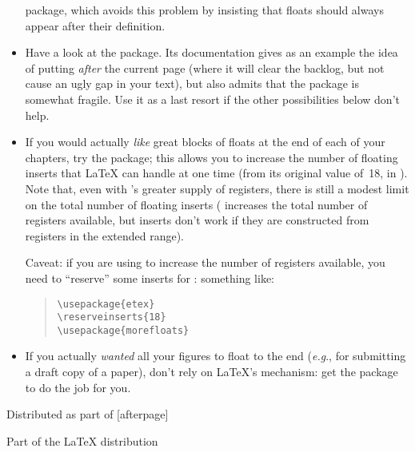 \begin{itemize}
  package, which avoids this problem by insisting that floats should
  always appear after their definition.
\item Have a look at the \LaTeXe{}  package.
  Its documentation gives as an example the idea
  of putting  \emph{after} the current page (where it
  will clear the backlog, but not cause an ugly gap in your text), but
  also admits that the package is somewhat fragile.  Use it as a last
  resort if the other possibilities below don't help.
\item If you would actually \emph{like} great blocks of floats at the
  end of each of your chapters, try the  package;
  this allows you to increase the number of floating inserts that \LaTeX{}
  can handle at one time (from its original value of~18, in
  \LaTeXe{}).  Note that, even with \etex{}'s greater supply of
  registers, there is still a modest limit on the total number of
  floating inserts (\etex{} increases the total number of registers
  available, but inserts don't work if they are constructed from
  registers in the extended range).

  Caveat: if you are using  to increase the number of
  registers available, you need to ``reserve'' some inserts for
  : something like:
  \begin{quote}
\begin{verbatim}
\usepackage{etex}
\reserveinserts{18}
\usepackage{morefloats}
\end{verbatim}
  \end{quote}
\item If you actually \emph{wanted} all your figures to float to the
  end (\emph{e.g}., for submitting a draft copy of a paper), don't
  rely on \LaTeX{}'s mechanism: get the  package to do
  the job for you.
\end{itemize}
\begin{ctanrefs}
\item[afterpage.sty]Distributed as part of [afterpage]
\item[endfloat.sty]
\item[etex.sty]
\item[flafter.sty]Part of the \LaTeX{} distribution
\item[float.sty]
\item[morefloats.sty]
\item[placeins.sty]
\end{ctanrefs}

